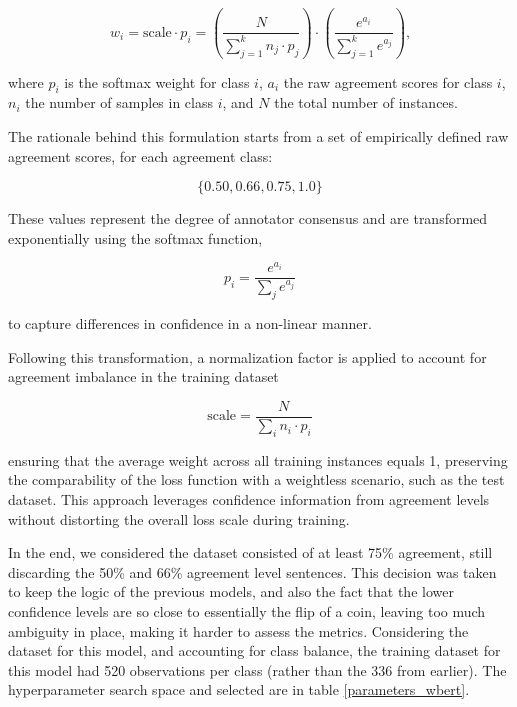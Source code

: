 \documentclass[conference]{IEEEtran}
\begin{document}

$$
w_i = \text{scale} \cdot p_i = \left( \frac{N}{\sum_{j=1}^k n_j \cdot p_j} \right) \cdot  \left( \frac{e^{a_i}}{\sum_{j=1}^k e^{a_j}} \right) \text{,}
$$

\noindent where $p_i$ is the softmax weight for class $i$, $a_i$ the raw agreement scores for class $i$, $n_i$ the number of samples in class $i$, and $N$ the total number of instances.

The rationale behind this formulation starts from a set of empirically defined raw agreement scores, for each agreement class:

$$
\{0.50, 0.66, 0.75, 1.0\}
$$

These values represent the degree of annotator consensus and are transformed exponentially using the softmax function,

$$
p_i = \frac{e^{a_i}}{\sum_j e^{a_j}}
$$

\noindent to capture differences in confidence in a non-linear manner.

Following this transformation, a normalization factor is applied to account for agreement imbalance in the training dataset

$$
\text{scale} = \frac{N}{\sum_i n_i \cdot p_i}
$$

\noindent ensuring that the average weight across all training instances equals 1, preserving the comparability of the loss function with a weightless scenario, such as the test dataset. This approach leverages confidence information from agreement levels without distorting the overall loss scale during training.


In the end, we considered the dataset consisted of at least 75\% agreement, still discarding the 50\% and 66\% agreement level sentences. This decision was taken to keep the logic of the previous models, and also the fact that the lower confidence levels are so close to essentially the flip of a coin, leaving too much ambiguity in place, making it harder to assess the metrics. Considering the dataset for this model, and accounting for class balance, the training dataset for this model had 520 observations per class (rather than the 336 from earlier). The hyperparameter search space and selected are in table \ref{parameters_wbert}.
\end{document}

